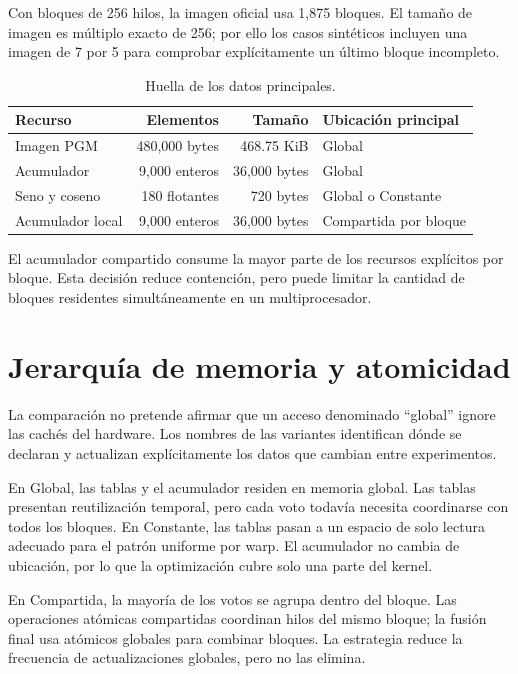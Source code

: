 \documentclass[12pt,letterpaper]{article}
\begin{document}
Con bloques de 256 hilos, la imagen oficial usa 1,875 bloques. El tamaño de imagen es múltiplo exacto de 256; por ello los casos sintéticos incluyen una imagen de 7 por 5 para comprobar explícitamente un último bloque incompleto.

\begin{table}[H]
  \centering
  \caption{Huella de los datos principales.}
  \begin{tabularx}{\textwidth}{XrrX}
    \toprule
    Recurso & Elementos & Tamaño & Ubicación principal \\
    \midrule
    Imagen PGM & 480,000 bytes & 468.75 KiB & Global \\
    Acumulador & 9,000 enteros & 36,000 bytes & Global \\
    Seno y coseno & 180 flotantes & 720 bytes & Global o Constante \\
    Acumulador local & 9,000 enteros & 36,000 bytes & Compartida por bloque \\
    \bottomrule
  \end{tabularx}
\end{table}

El acumulador compartido consume la mayor parte de los recursos explícitos por bloque. Esta decisión reduce contención, pero puede limitar la cantidad de bloques residentes simultáneamente en un multiprocesador.

\section{Jerarquía de memoria y atomicidad}

La comparación no pretende afirmar que un acceso denominado ``global'' ignore las cachés del hardware. Los nombres de las variantes identifican dónde se declaran y actualizan explícitamente los datos que cambian entre experimentos.

En Global, las tablas y el acumulador residen en memoria global. Las tablas presentan reutilización temporal, pero cada voto todavía necesita coordinarse con todos los bloques. En Constante, las tablas pasan a un espacio de solo lectura adecuado para el patrón uniforme por warp. El acumulador no cambia de ubicación, por lo que la optimización cubre solo una parte del kernel.

En Compartida, la mayoría de los votos se agrupa dentro del bloque. Las operaciones atómicas compartidas coordinan hilos del mismo bloque; la fusión final usa atómicos globales para combinar bloques. La estrategia reduce la frecuencia de actualizaciones globales, pero no las elimina.
\end{document}
